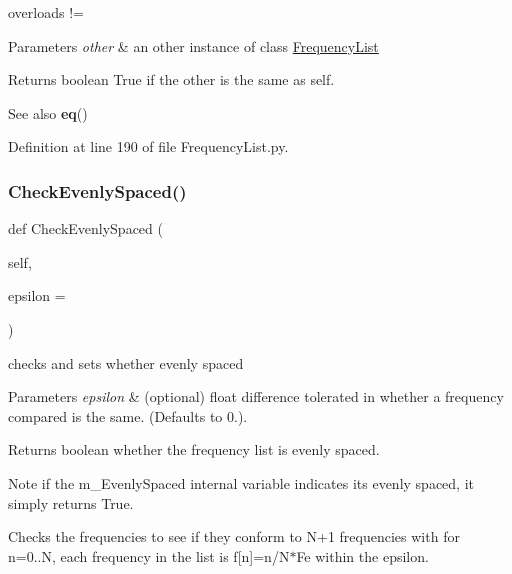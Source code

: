 overloads != 


\begin{DoxyParams}{Parameters}
{\em other} & an other instance of class \hyperlink{classSignalIntegrity_1_1FrequencyDomain_1_1FrequencyList_1_1FrequencyList}{Frequency\+List} \\
\hline
\end{DoxyParams}
\begin{DoxyReturn}{Returns}
boolean True if the other is the same as self. 
\end{DoxyReturn}
\begin{DoxySeeAlso}{See also}
{\bfseries eq}() 
\end{DoxySeeAlso}


Definition at line 190 of file Frequency\+List.\+py.

\mbox{\label{classSignalIntegrity_1_1FrequencyDomain_1_1FrequencyList_1_1FrequencyList_a903469a93e04d2e4604e4350f2096a2d}} 
\subsubsection{\texorpdfstring{Check\+Evenly\+Spaced()}{CheckEvenlySpaced()}}
{\footnotesize\ttfamily def Check\+Evenly\+Spaced (\begin{DoxyParamCaption}\item[{}]{self,  }\item[{}]{epsilon = {} }\end{DoxyParamCaption})}



checks and sets whether evenly spaced 


\begin{DoxyParams}{Parameters}
{\em epsilon} & (optional) float difference tolerated in whether a frequency compared is the same. (Defaults to 0.). \\
\hline
\end{DoxyParams}
\begin{DoxyReturn}{Returns}
boolean whether the frequency list is evenly spaced. 
\end{DoxyReturn}
\begin{DoxyNote}{Note}
if the m\+\_\+\+Evenly\+Spaced internal variable indicates it\textquotesingle{}s evenly spaced, it simply returns True.
\end{DoxyNote}
Checks the frequencies to see if they conform to N+1 frequencies with for n=0..N, each frequency in the list is f\mbox{[}n\mbox{]}=n/\+N$\ast$\+Fe within the epsilon. 

